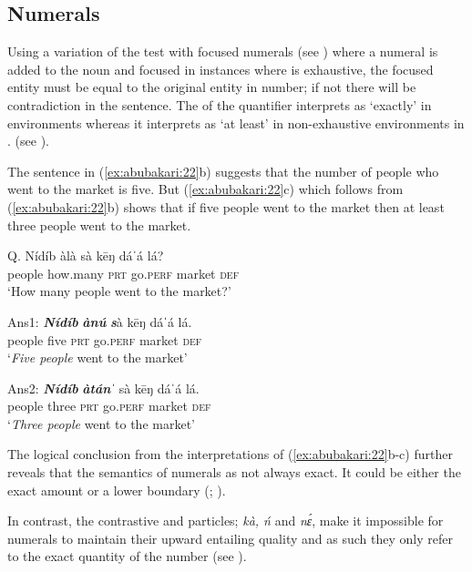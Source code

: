 \documentclass[output=paper,modfonts,nonflat,
 hidelinks
]{langsci/langscibook}
\begin{document}
\subsection{Numerals}

Using a variation of the  test with focused numerals (see \citealt{szabolcsi1981,ÉKiss1998}) where a numeral is added to the noun and focused in instances where  is exhaustive, the focused entity must be equal to the original entity in number; if not there will be contradiction in the sentence. The  of the quantifier interprets as ‘exactly’ in  environments whereas it interprets as ‘at least’ in non-exhaustive environments in . (see \citealt[155]{szabolcsi1981}).

 The sentence in (\ref{ex:abubakari:22}b) suggests that the number of people who went to the market is five. But (\ref{ex:abubakari:22}c) which follows from (\ref{ex:abubakari:22}b) shows that if five people went to the market then at least three people went to the market. 

 
\ea\label{ex:abubakari:22}
\ea\label{ex:abubakari:22a} 
Q. \gll Nídíb  àlà    sà  k\={e}ŋ dáˈá  lá? \\
people  how.many  \textsc{prt}  go.\textsc{perf} market  \textsc{def}\\                
\glt ‘How many people went to the market?’ 
 
\ex\label{ex:abubakari:22b} 
Ans1: \gll \textbf{\textit{Nídíb}}    \textbf{\textit{ànú}}  \textbf{\textit{s}}à  k\={e}ŋ dáˈá  lá.\\ 
people    five  \textsc{prt}  go.\textsc{perf} market  \textsc{def}\\
\glt ‘\textit{Five people} went to the market’ 

\ex\label{ex:abubakari:22c} 
Ans2: \gll \textbf{\textit{Nídíb}}    \textbf{\textit{àtánˈ}} sà  k\={e}ŋ dáˈá  lá.\\
people    three  \textsc{prt}  go.\textsc{perf} market  \textsc{def}\\
\glt ‘\textit{Three people} went to the market’
\z
\z

The logical conclusion from the interpretations of (\ref{ex:abubakari:22}b-c) further reveals that the semantics of numerals as not always exact. It could be either the exact amount or a lower boundary (\citealt{horn1972,levinson2000}; \citealt[cf][15]{vanderWal2013}).

In contrast, the contrastive and  particles; \textit{kà, ń} and \textit{nɛ́}, make it impossible for numerals to maintain their upward entailing quality and as such they only refer to the exact quantity of the number (see \citealt{vanKuppevelt1996,vanRooij2002,vanRooij2004}).
\end{document}
